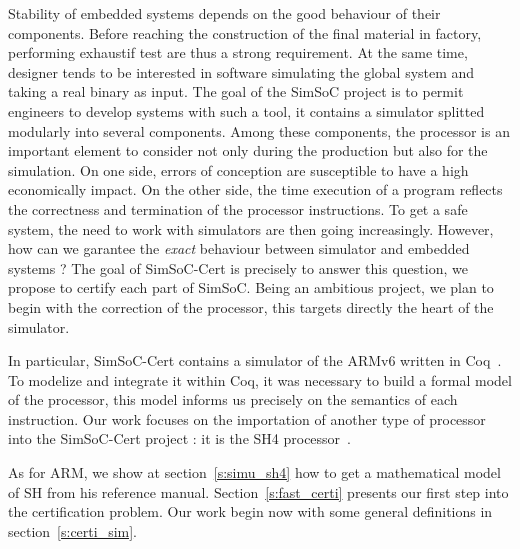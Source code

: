 \documentclass[a4paper, 11pt]{article}
\newcommand{\simsoc}{SimSoC\xspace}
\newcommand{\SScert}{SimSoC-Cert\xspace}
\begin{document}
Stability of embedded systems depends on the good behaviour of their components. Before reaching the construction of the final material in factory, performing exhaustif test are thus a strong requirement. At the same time, designer tends to be interested in software simulating the global system and taking a real binary as input. The goal of the \simsoc project is to permit engineers to develop systems with such a tool, it contains a simulator splitted modularly into several components. Among these components, the processor is an important element to consider not only during the production but also for the simulation. On one side, errors of conception are susceptible to have a high economically impact. On the other side, the time execution of a program reflects the correctness and termination of the processor instructions. To get a safe system, the need to work with simulators are then going increasingly. However, how can we garantee the \emph{exact} behaviour between simulator and embedded systems ? 
The goal of \SScert is precisely to answer this question, we propose to certify each part of \simsoc. Being an ambitious project, we plan to begin with the correction of the processor, this targets directly the heart of the simulator.

In particular, \SScert contains a simulator of the ARMv6 written in Coq~\cite{arm6refman, arm}. To modelize and integrate it within Coq, it was necessary to build a formal model of the processor, this model informs us precisely on the semantics of each instruction.
Our work focuses on the importation of another type of processor into the \SScert project : it is the SH4 processor~\cite{sh4refman}. 

As for ARM, we show at section~\ref{s:simu_sh4} how to get a mathematical model of SH from his reference manual. Section~\ref{s:fast_certi} presents our first step into the certification problem. Our work begin now with some general definitions in section~\ref{s:certi_sim}.
\end{document}
